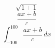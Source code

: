 \documentclass[12pt]{article}
\begin{document}
$$ \sqrt{1+1} $$ 
$$ \frac{ax+b}{c} $$
$$ \int^{100}_{-100} \frac{ax+b}{c}\,dx $$
\end{document}
